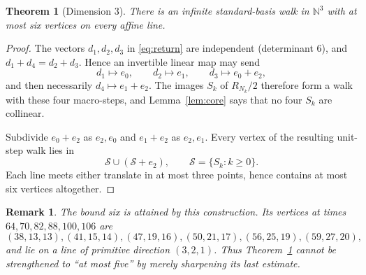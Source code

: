 \documentclass[11pt]{article}
\newtheorem*{theorem}{Theorem}
\newtheorem*{remark}{Remark}
\newcommand{\N}{\mathbb N}
\begin{document}
\begin{theorem}[Dimension $3$]\label{thm:d3}
There is an infinite standard-basis walk in $\N^3$ with at most six
vertices on every affine line.
\end{theorem}
\begin{proof}
The vectors $d_1,d_2,d_3$ in \eqref{eq:return} are independent
(determinant $6$), and $d_1+d_4=d_2+d_3$.  Hence an invertible linear map
may send
\[
 d_1\mapsto e_0,\qquad d_2\mapsto e_1,\qquad
 d_3\mapsto e_0+e_2,
\]
and then necessarily $d_4\mapsto e_1+e_2$.  The images
$S_k$ of $R_{N_k}/2$ therefore form a walk with these four macro-steps,
and Lemma~\ref{lem:core} says that no four $S_k$ are collinear.

Subdivide $e_0+e_2$ as $e_2,e_0$ and $e_1+e_2$ as $e_2,e_1$.  Every
vertex of the resulting unit-step walk lies in
\[
 \mathcal S\cup(\mathcal S+e_2),\qquad \mathcal S=\{S_k:k\ge0\}.
\]
Each line meets either translate in at most three points, hence contains
at most six vertices altogether.
\end{proof}

\begin{remark}
The bound six is attained by this construction.  Its vertices at times
$64,70,82,88,100,106$ are
\[
(38,13,13),(41,15,14),(47,19,16),(50,21,17),(56,25,19),(59,27,20),
\]
and lie on a line of primitive direction $(3,2,1)$.  Thus Theorem~\ref{thm:d3}
cannot be strengthened to ``at most five'' by merely sharpening its last
estimate.
\end{remark}
\end{document}
